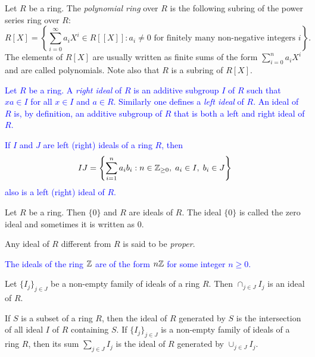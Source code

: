 \begin{example}
	Let $R$ be a ring. The {\em polynomial ring} over $R$ is the following subring of the power series ring over $R$:
	\[
	R[X]=\left\{ \sum_{i=0}^{\infty}a_iX^{i}\in R[\![X]\!] : a_i\neq 0 \mbox{ for finitely many non-negative integers } i \right\}.
	\]
	The elements of $R[X]$ are usually written as finite sums of the 
	form $\sum_{i=0}^na_iX^{i}$ and are called polynomials. Note also that $R$ is a subring of $R[X]$.
\end{example}

\textcolor{blue}{
Let $R$ be a ring. A \emph{right ideal} of $R$ is an additive subgroup $I$ of $R$ such that $xa\in I$ for all $x\in I$ and $a\in R$.
Similarly one defines a \emph{left ideal} 
of $R$. An ideal of $R$ is, by definition, an additive subgroup of $R$ that is
both a left and right ideal of $R$.}

\textcolor{blue}{
If $I$ and $J$ are left (right) ideals of a ring $R$, then
\[
IJ=\left\{\sum_{i=1}^{n} a_ib_i:n\in\mathbb{Z}_{\geq0},\; a_i\in I,\; b_i\in J\right\}
\]
also is a left (right) ideal of $R$.}


\begin{example}
    Let $R$ be a ring. Then $\{ 0\}$ and $R$ are ideals of $R$. The ideal $\{ 0\}$
    is called the zero ideal and sometimes it is written as $0$.
\end{example}

Any ideal of $R$ different from $R$ is said to be {\em proper}.

\begin{example}
    \textcolor{blue}{The ideals of the ring $\mathbb{Z}$ are of the form $n\mathbb{Z}$ for some integer $n\geq0$.}
\end{example}

\begin{example} 
    Let $\{I_j\}_{j\in J}$ be a non-empty family of ideals of a ring $R$. Then $\cap_{j\in J}I_j$ is an ideal of $R$.
\end{example}

If $S$ is a subset of a ring $R$, then the ideal of $R$ generated by $S$ 
is the intersection of all ideal $I$ of $R$ containing $S$. If
$\{I_j\}_{j\in J}$ is a non-empty family of ideals of a ring $R$, then its sum $\sum_{j\in J}I_j$ is the ideal of $R$ generated by
$\cup_{j\in  J}I_j$.

